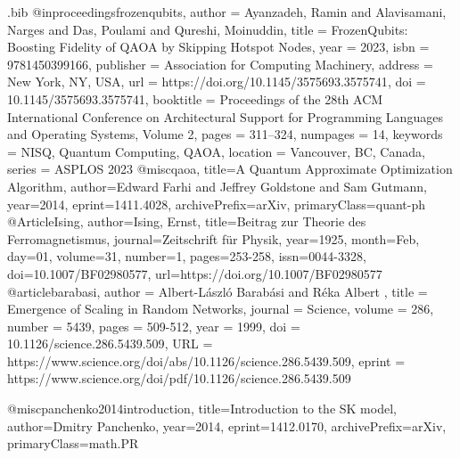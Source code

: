 \usepackage{datetime}

\usepackage{amssymb}
\usepackage{amsmath}
\usepackage{subfig}
\usepackage{pgfplots}
\usetikzlibrary{positioning,calc,arrows}
\usepackage{float}
\usepackage{stackengine}
\usepackage{xcolor}

\begin{filecontents}{\jobname.bib}
@inproceedings{frozenqubits,
author = {Ayanzadeh, Ramin and Alavisamani, Narges and Das, Poulami and Qureshi, Moinuddin},
title = {FrozenQubits: Boosting Fidelity of QAOA by Skipping Hotspot Nodes},
year = {2023},
isbn = {9781450399166},
publisher = {Association for Computing Machinery},
address = {New York, NY, USA},
url = {https://doi.org/10.1145/3575693.3575741},
doi = {10.1145/3575693.3575741},
booktitle = {Proceedings of the 28th ACM International Conference on Architectural Support for Programming Languages and Operating Systems, Volume 2},
pages = {311–324},
numpages = {14},
keywords = {NISQ, Quantum Computing, QAOA},
location = {Vancouver, BC, Canada},
series = {ASPLOS 2023}
}
@misc{qaoa,
      title={A Quantum Approximate Optimization Algorithm}, 
      author={Edward Farhi and Jeffrey Goldstone and Sam Gutmann},
      year={2014},
      eprint={1411.4028},
      archivePrefix={arXiv},
      primaryClass={quant-ph}
}
@Article{Ising,
author={Ising, Ernst},
title={Beitrag zur Theorie des Ferromagnetismus},
journal={Zeitschrift f{\"u}r Physik},
year={1925},
month={Feb},
day={01},
volume={31},
number={1},
pages={253-258},
issn={0044-3328},
doi={10.1007/BF02980577},
url={https://doi.org/10.1007/BF02980577}
}
@article{barabasi,
author = {Albert-László Barabási  and Réka Albert },
title = {Emergence of Scaling in Random Networks},
journal = {Science},
volume = {286},
number = {5439},
pages = {509-512},
year = {1999},
doi = {10.1126/science.286.5439.509},
URL = {https://www.science.org/doi/abs/10.1126/science.286.5439.509},
eprint = {https://www.science.org/doi/pdf/10.1126/science.286.5439.509}
}

@misc{panchenko2014introduction,
      title={Introduction to the SK model}, 
      author={Dmitry Panchenko},
      year={2014},
      eprint={1412.0170},
      archivePrefix={arXiv},
      primaryClass={math.PR}
}


\end{filecontents}
